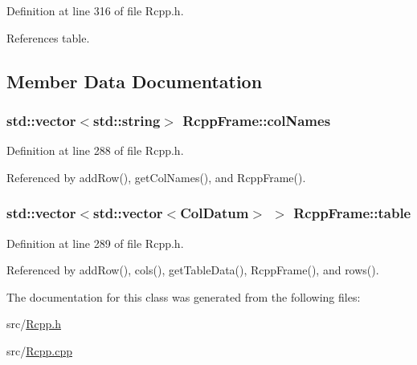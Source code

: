 Definition at line 316 of file Rcpp.h.

References table.

\subsection{Member Data Documentation}
\hypertarget{classRcppFrame_a9b549d377248896848b6abcb8df64f82}{
\subsubsection[{colNames}]{\setlength{\rightskip}{0pt plus 5cm}std::vector$<$std::string$>$ {\bf RcppFrame::colNames}}}
\label{classRcppFrame_a9b549d377248896848b6abcb8df64f82}


Definition at line 288 of file Rcpp.h.

Referenced by addRow(), getColNames(), and RcppFrame().\hypertarget{classRcppFrame_a4de0bda5c0df650b2447a4c029af0302}{
\subsubsection[{table}]{\setlength{\rightskip}{0pt plus 5cm}std::vector$<$std::vector$<${\bf ColDatum}$>$ $>$ {\bf RcppFrame::table}}}
\label{classRcppFrame_a4de0bda5c0df650b2447a4c029af0302}


Definition at line 289 of file Rcpp.h.

Referenced by addRow(), cols(), getTableData(), RcppFrame(), and rows().

The documentation for this class was generated from the following files:\begin{DoxyCompactItemize}
\item 
src/\hyperlink{Rcpp_8h}{Rcpp.h}\item 
src/\hyperlink{Rcpp_8cpp}{Rcpp.cpp}\end{DoxyCompactItemize}
